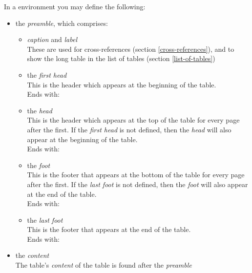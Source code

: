 \bigskip

In a  environment you may define the following:

\begin{itemize}
	\item the \emph{preamble}, which comprises:
	\begin{itemize}
		\item \emph{caption} and \emph{label} \\
		These are used for cross-references (section \ref{cross-references}), and to show the long table in the list of tables (section \ref{list-of-tables})
		
		\item the \emph{first head} \\
		This is the header which appears at the beginning of the table. \\
		Ends with: 
		
		\item the \emph{head} \\
		This is the header which appears at the top of the table for every page after the first.
		If the \emph{first head} is not defined, then the \emph{head} will also appear at the beginning of the table. \\
		Ends with: 
	
		\item the \emph{foot} \\
		This is the footer that appears at the bottom of the table for every page after the first.
		If the \emph{last foot} is not defined, then the \emph{foot} will also appear at the end of the table. \\
		Ends with: 
		
		\item the \emph{last foot} \\
		This is the footer that appears at the end of the table. \\
		Ends with: 
		
	\end{itemize}
	\item the \emph{content} \\
	The table's \emph{content} of the table is found after the \emph{preamble} \\
\end{itemize}


